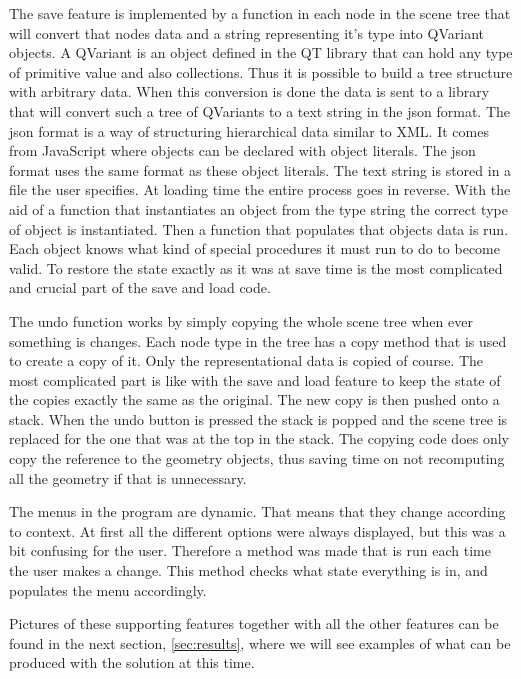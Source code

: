 \documentclass[a4paper,12pt]{report}
\newcommand{\secref}[1]{\autoref{#1}}
\begin{document}
The save feature is implemented by a function in each node in the scene tree that will convert that nodes data and a string representing it's type into QVariant objects. A QVariant is an object defined in the QT library that can hold any type of primitive value and also collections. Thus it is possible to build a tree structure with arbitrary data. When this conversion is done the data is sent to a library that will convert such a tree of QVariants to a text string in the json format. The json format is a way of structuring hierarchical data similar to XML. It comes from JavaScript where objects can be declared with object literals. The json format uses the same format as these object literals. The text string is stored in a file the user specifies. At loading time the entire process goes in reverse. With the aid of a function that instantiates an object from the type string the correct type of object is instantiated. Then a function that populates that objects data is run. Each object knows what kind of 
special procedures it must run to do to become valid. To restore the state exactly as it was at save time is the most complicated and crucial part of the save and load code.

The undo function works by simply copying the whole scene tree when ever something is changes. Each node type in the tree has a copy method that is used to create a copy of it. Only the representational data is copied of course. The most complicated part is like with the save and load feature to keep the state of the copies exactly the same as the original. The new copy is then pushed onto a stack. When the undo button is pressed the stack is popped and the scene tree is replaced for the one that was at the top in the stack. The copying code does only copy the reference to the geometry objects, thus saving time on not recomputing all the geometry if that is unnecessary.

The menus in the program are dynamic. That means that they change according to context. At first all the different options were always displayed, but this was a bit confusing for the user. Therefore a method was made that is run each time the user makes a change. This method checks what state everything is in, and populates the menu accordingly.

Pictures of these supporting features together with all the other features can be found in the next section, \secref{sec:results}, where we will see examples of what can be produced with the solution at this time.
\end{document}
